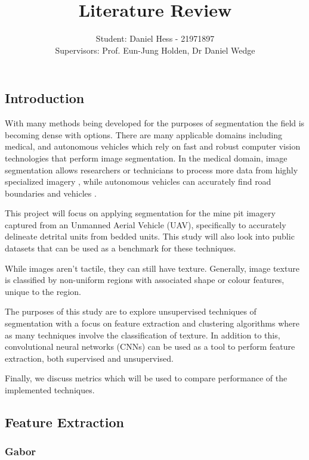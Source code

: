 \documentclass[a4]{article}
\title{Literature Review}
\author{Student: Daniel Hess - 21971897\\Supervisors: Prof. Eun-Jung Holden, Dr Daniel Wedge}
\date{}
\begin{document}
\maketitle

\subsection*{Introduction}

With many methods being developed for the purposes of segmentation the field is becoming dense with options. There are many applicable domains including medical, and autonomous vehicles which rely on fast and robust computer vision technologies that perform image segmentation. In the medical domain, image segmentation allows researchers or technicians to process more data from highly specialized imagery \cite{yang2002segmentation}, while autonomous vehicles can accurately find road boundaries and vehicles \cite{ha2017mfnet}. 

  

This project will focus on applying segmentation for the mine pit imagery captured from an Unmanned Aerial Vehicle (UAV), specifically to accurately delineate detrital units from bedded units. This study will also look into public datasets \cite{halley2012perceptually} \cite{hossain2013texture} that can be used as a benchmark for these techniques. 

  
While images aren't tactile, they can still have texture. Generally, image texture is classified by non-uniform regions with associated shape or colour features, unique to the region.

The purposes of this study are to explore unsupervised techniques of segmentation with a focus on feature extraction and clustering algorithms where as many techniques involve the classification of texture. In addition to this, convolutional neural networks (CNNs) can be used as a tool to perform feature extraction, both supervised and unsupervised.

  

Finally, we discuss metrics which will be used to compare performance of the implemented techniques.

\subsection*{Feature Extraction}

\subsubsection*{Gabor}
\end{document}
